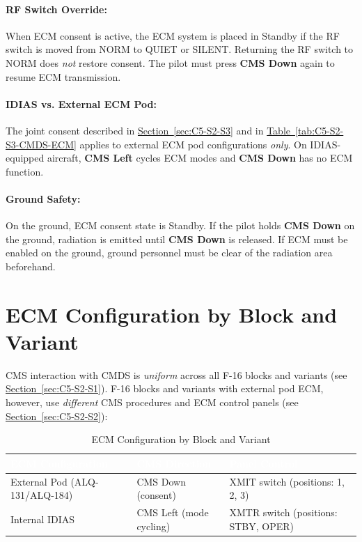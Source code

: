\documentclass[11pt, a4paper, twoside]{report}
\newcommand{\secref}[1]{\hyperref[#1]{Section~\ref*{#1}}}
\newcommand{\tabref}[1]{\hyperref[#1]{Table~\ref*{#1}}}
\begin{document}
\paragraph{RF Switch Override:}

When ECM consent is active, the ECM system is placed in Standby if the RF switch is moved from NORM to QUIET or SILENT. Returning the RF switch to NORM does \textit{not} restore consent. The pilot must press \textbf{CMS Down} again to resume ECM transmission.

\paragraph{IDIAS vs. External ECM Pod:}

The joint consent described in \secref{sec:C5-S2-S3} and in \tabref{tab:C5-S2-S3-CMDS-ECM} applies to external ECM pod configurations \textit{only}. On IDIAS-equipped aircraft, \textbf{CMS Left} cycles ECM modes and \textbf{CMS Down} has no ECM function.

\paragraph{Ground Safety:}

On the ground, ECM consent state is Standby. If the pilot holds \textbf{CMS Down} on the ground, radiation is emitted until \textbf{CMS Down} is released. If ECM must be enabled on the ground, ground personnel must be clear of the radiation area beforehand.

\section{ECM Configuration by Block and Variant}
\label{sec:C5-S3}

CMS interaction with CMDS is \textit{uniform} across all F-16 blocks and variants (see \secref{sec:C5-S2-S1}). F-16 blocks and variants with external pod ECM, however, use \textit{different} CMS procedures and ECM control panels (see \secref{sec:C5-S2-S2}):

\begin{table}[H]
\centering
\caption{ECM Configuration by Block and Variant}
\label{tab:C5-S3-ecm-config-summary}
\small
\renewcommand{\arraystretch}{1.25}
\begin{tabular}{|>{\raggedright\arraybackslash}p{3.6cm}|>{\raggedright\arraybackslash}p{3.6cm}|>{\raggedright\arraybackslash}p{4.6cm}|}
\hline
\rowcolor{headerblue}
\textcolor{white}{\textbf{ECM Configuration}} & \textcolor{white}{\textbf{CMS Direction}} & \textcolor{white}{\textbf{Panel Control}} \\
\hline
External Pod (ALQ-131/ALQ-184) & CMS Down (consent) & XMIT switch (positions: 1, 2, 3) \\
\hline
Internal IDIAS & CMS Left (mode cycling) & XMTR switch (positions: STBY, OPER) \\
\hline
\end{tabular}
\end{table}
\end{document}
